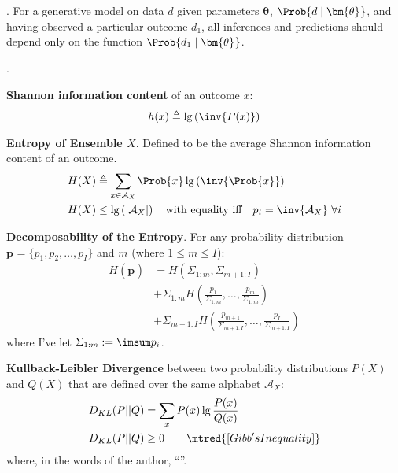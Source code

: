 \documentclass[11pt]{article}
\renewcommand\vec[2][]{\bm{#2}_{#1}}
\newcommand\myspace[1][]{\vspace{#1\bigskipamount}}
\newcommand\p{\Needspace{10\baselineskip} \noindent}
\begin{document}
\myspace
\p {}. For a generative model on data $d$ given parameters $\vec\theta$, $\Prob{d \mid \vec\theta}$, and having observed a particular outcome $d_1$, all inferences and predictions should depend only on the function $\Prob{d_1 \mid \vec\theta}$. 

\myspace
\p {}.
\begin{compactitem}[-]
	\item \textbf{Shannon information content} of an outcome $x$:
	\begin{align}
		h(x) \triangleq \lg \left( \inv{P(x)} \right)
	\end{align}
	
	\item \textbf{Entropy of Ensemble $X$}. Defined to be the average Shannon information content of an outcome.
	\begin{align}
		H(X) &\triangleq \sum_{x \in \mathcal{A}_X} \Prob{x}  \lg \left( \inv{\Prob{x}} \right) \\
		H(X) &\le \lg \left( |\mathcal{A}_X| \right) \quad \text{with equality iff} \quad  p_i = \inv{\mathcal{A}_X} ~  \forall i
	\end{align}
	
	\item \textbf{Decomposability of the Entropy}. For any probability distribution $\vec p = \{p_1, p_2, \ldots, p_I\}$ and $m$ (where $1 \le m \le I$):
	\begin{align}
		H(\vec{p}) &= H\left( \Sigma_{1:m}, \Sigma_{m+1:I} \right) \\
		&+ \Sigma_{1:m} H\left( \frac{p_1}{\Sigma_{1:m}}, \ldots, \frac{p_m}{\Sigma_{1:m}} \right) \\
		&+ \Sigma_{m+1:I} H\left( \frac{p_{m+1}}{\Sigma_{m+1:I}}, \ldots, \frac{p_I}{\Sigma_{m+1:I}} \right)
	\end{align}
	where I've let $\Sigma_{1:m} := \imsum p_i$.
	
	\item \textbf{Kullback-Leibler Divergence} between two probability distributions $P(X)$ and $Q(X)$ that are defined over the same alphabet $\mathcal{A}_X$:
	\begin{align}
		D_{KL}(P||Q) &= \sum_x P(x) \lg \frac{P(x)}{Q(x)} \\
		 D_{KL}(P||Q) &\ge 0 \qquad \mtred{[Gibb's Inequality]} 
	\end{align}
	where, in the words of the author, ``''.
	

\end{compactitem}
\end{document}
